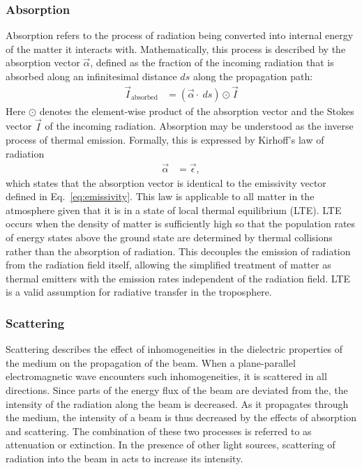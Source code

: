 \subsubsection{Absorption}

Absorption refers to the process of radiation being converted into internal
energy of the matter it interacts with. Mathematically, this process is
described by the absorption vector $\vec{\alpha}$, defined as the fraction of
the incoming radiation that is absorbed along an infinitesimal distance $ds$
along the propagation path:
\begin{align}
\vec{I}_\text{absorbed} &= (\vec{\alpha} \cdot\ ds) \odot \vec{I}
\end{align}
Here $\odot$ denotes the element-wise product of the absorption vector and
the Stokes vector $\vec{I}$ of the incoming radiation. Absorption may be
understood as the inverse process of thermal emission. Formally, this is
expressed by Kirhoff's  law of radiation
\begin{align}
  \vec{\alpha} &= \vec{\epsilon},
\end{align}
which states that the absorption vector is identical to the emissivity vector
defined in Eq.~\ref{eq:emissivity}. This law is applicable to all matter in the
atmosphere given that it is in a state of local thermal equilibrium (LTE). LTE
occurs when the density of matter is sufficiently high so that the population
rates of energy states above the ground state are determined by thermal
collisions rather than the absorption of radiation. This decouples the emission
of radiation from the radiation field itself, allowing the simplified treatment
of matter as thermal emitters with the emission rates independent of the
radiation field. LTE is a valid assumption for radiative transfer in the
troposphere.

\subsubsection{Scattering}

Scattering describes the effect of inhomogeneities in the dielectric properties
of the medium on the propagation of the beam. When a plane-parallel
electromagnetic wave encounters such inhomogeneities, it is scattered in all
directions. Since parts of the energy flux of the beam are deviated from the,
the intensity of the radiation along the beam is decreased. As it propagates
through the medium, the intensity of a beam is thus decreased by the effects of
absorption and scattering. The combination of these two processes is referred to
as attenuation or extinction. In the presence of other light sources, scattering
of radiation into the beam in acts to increase its intensity.

